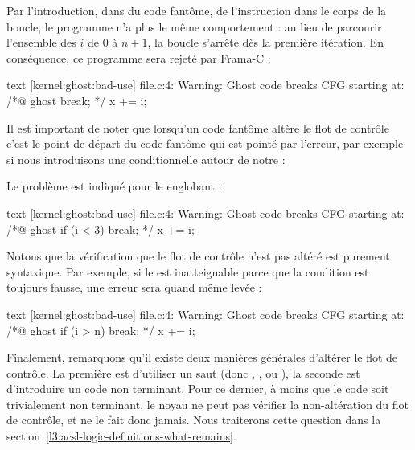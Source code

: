

Par l'introduction, dans du code fantôme, de l'instruction  dans
le corps de la boucle, le programme n'a plus le même comportement : au lieu de
parcourir l'ensemble des $i$ de $0$ à $n+1$, la boucle s'arrête dès la première
itération. En conséquence, ce programme sera rejeté par Frama-C :


\begin{CodeBlock}{text}
[kernel:ghost:bad-use] file.c:4: Warning:
  Ghost code breaks CFG starting at:
  /*@ ghost break; */
  x += i;
\end{CodeBlock}


Il est important de noter que lorsqu'un code fantôme altère le flot de contrôle
c'est le point de départ du code fantôme qui est pointé par l'erreur, par exemple
si nous introduisons une conditionnelle autour de notre  :




Le problème est indiqué pour le  englobant :


\begin{CodeBlock}{text}
[kernel:ghost:bad-use] file.c:4: Warning:
  Ghost code breaks CFG starting at:
  /*@ ghost if (i < 3) break; */
  x += i;
\end{CodeBlock}


Notons que la vérification que le flot de contrôle n'est pas altéré est purement
syntaxique. Par exemple, si le  est inatteignable parce que la
condition est toujours fausse, une erreur sera quand même levée :




\begin{CodeBlock}{text}
[kernel:ghost:bad-use] file.c:4: Warning:
  Ghost code breaks CFG starting at:
  /*@ ghost if (i > n) break; */
  x += i;
\end{CodeBlock}


Finalement, remarquons qu'il existe deux manières générales d'altérer le flot de
contrôle. La première est d'utiliser un saut (donc ,
, ou ), la seconde est d'introduire un code
non terminant. Pour ce dernier, à moins que le code soit trivialement non terminant,
le noyau ne peut pas vérifier la non-altération du flot de contrôle, et ne le fait
donc jamais. Nous traiterons cette question dans la
section~\ref{l3:acsl-logic-definitions-what-remains}.


